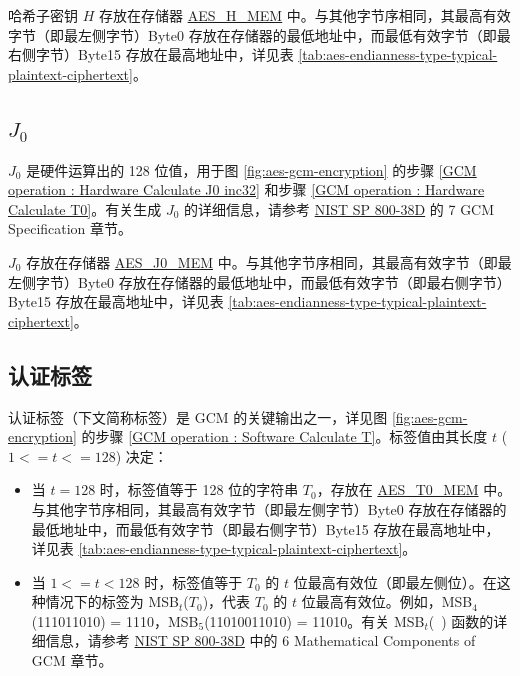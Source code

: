 \documentclass[main\_\_CN.tex]{subfiles}
\begin{document}
哈希子密钥 $H$ 存放在存储器 \hyperref[memdesc:AESHMEM]{AES\_H\_MEM} 中。与其他字节序相同，其最高有效字节（即最左侧字节）Byte0 存放在存储器的最低地址中，而最低有效字节（即最右侧字节）Byte15 存放在最高地址中，详见表 \ref{tab:aes-endianness-type-typical-plaintext-ciphertext}。


\subsection{\texorpdfstring{$J_0$}{J0}} \label{Label J0}

$J_0$ 是硬件运算出的 128 位值，用于图 \ref{fig:aes-gcm-encryption} 的步骤 \ref{GCM operation : Hardware Calculate J0 inc32} 和步骤 \ref{GCM operation : Hardware Calculate T0}。有关生成 $J_0$ 的详细信息，请参考 \href{https://nvlpubs.nist.gov/nistpubs/Legacy/SP/nistspecialpublication800-38d.pdf}{NIST SP 800-38D} 的 7 GCM Specification 章节。

$J_0$ 存放在存储器 \label{memdesc:AESJ0MEM}\hyperref[memdesc:AESJ0MEM]{AES\_J0\_MEM} 中。与其他字节序相同，其最高有效字节（即最左侧字节）Byte0 存放在存储器的最低地址中，而最低有效字节（即最右侧字节）Byte15 存放在最高地址中，详见表 \ref{tab:aes-endianness-type-typical-plaintext-ciphertext}。


\subsection{认证标签}\label{Label Authenticated Tag}

认证标签（下文简称标签）是 GCM 的关键输出之一，详见图 \ref{fig:aes-gcm-encryption} 的步骤 \ref{GCM operation : Software Calculate T}。标签值由其长度 $t$
($1 <= t <= 128$) 决定：

\begin{itemize}
    \item 当 $t = 128$ 时，标签值等于 128 位的字符串 $T_0$，存放在 \label{memdesc:AEST0MEM}\hyperref[memdesc:AEST0MEM]{AES\_T0\_MEM} 中。与其他字节序相同，其最高有效字节（即最左侧字节）Byte0 存放在存储器的最低地址中，而最低有效字节（即最右侧字节）Byte15 存放在最高地址中，详见表 \ref{tab:aes-endianness-type-typical-plaintext-ciphertext}。

    \item 当 $1 <= t < 128$ 时，标签值等于 $T_0$ 的 $t$ 位最高有效位（即最左侧位）。在这种情况下的标签为 MSB$_t$($T_0$)，代表 $T_0$ 的 $t$ 位最高有效位。例如，MSB$_4$(111011010) = 1110，MSB$_5$(11010011010) = 11010。有关 MSB$_t$(\ ) 函数的详细信息，请参考 \href{https://nvlpubs.nist.gov/nistpubs/Legacy/SP/nistspecialpublication800-38d.pdf}{NIST SP 800-38D} 中的 6 Mathematical Components of GCM 章节。

\end{itemize}
\end{document}
